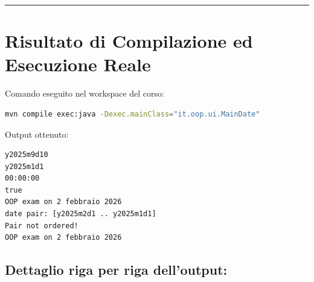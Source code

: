 \documentclass[11pt,a4paper,oneside]{report}
\begin{document}
\begin{center}\rule{0.5\linewidth}{0.5pt}\end{center}

\section{Risultato di Compilazione ed Esecuzione
Reale}\label{chap13_risultato-di-compilazione-ed-esecuzione-reale}

Comando eseguito nel workspace del corso:

\begin{lstlisting}[language=bash]
mvn compile exec:java -Dexec.mainClass="it.oop.ui.MainDate"
\end{lstlisting}

Output ottenuto:

\begin{lstlisting}
y2025m9d10
y2025m1d1
00:00:00
true
OOP exam on 2 febbraio 2026
date pair: [y2025m2d1 .. y2025m1d1]
Pair not ordered!
OOP exam on 2 febbraio 2026
\end{lstlisting}

\subsection{Dettaglio riga per riga
dell'output:}\label{chap13_dettaglio-riga-per-riga-delloutput}
\end{document}
